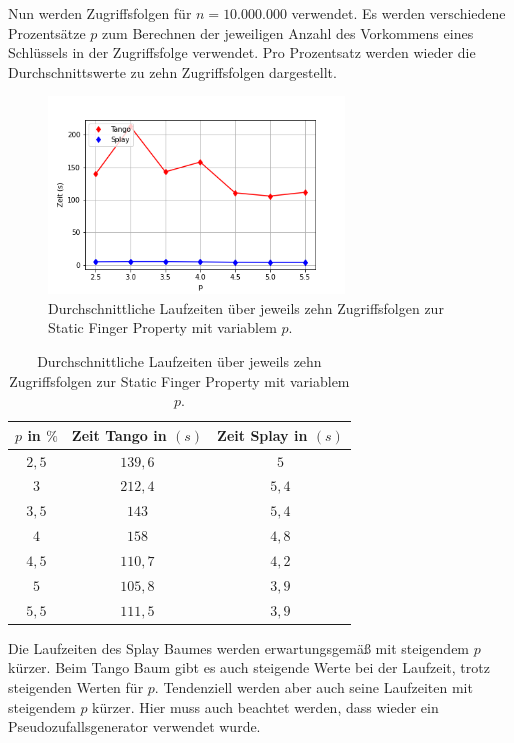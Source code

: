 \documentclass[a4paper,12pt]{article}
\begin{document}
\noindent Nun werden Zugriffsfolgen für $n = 10.000.000$ verwendet. Es werden verschiedene Prozentsätze $p$ zum Berechnen der jeweiligen Anzahl des Vorkommens eines Schlüssels in der Zugriffsfolge verwendet. Pro Prozentsatz werden wieder die Durchschnittswerte zu zehn Zugriffsfolgen dargestellt. 
\begin{figure}[H]
	\centering
	\includegraphics[width=0.7\textwidth]{Medien/laufzeittest/diagramm/staticfinger4}
	\caption{Durchschnittliche Laufzeiten über jeweils zehn Zugriffsfolgen zur Static Finger Property mit variablem $p$.}
\end{figure}
\begin{table}[H]
	\begin{center}
		\begin{tabular}[c]{|c|c|c|}
			\hline
			$p$ in $\%$ & Zeit Tango in $\left(s\right)$ &Zeit Splay in $\left(s\right)$ \\
			\hline
			$2,5$  & $139,6$ &$5$  \\
			\hline
			$3$  &   $212,4$ &  $5,4$  \\
			\hline
			$3,5$  & $143$ &$5,4$  \\
			\hline
			$4$ &    $158$ &$4,8$ \\
			\hline
			$4,5$  & $110,7$ &$4,2$  \\
			\hline
			$5$  &   $105,8$ &  $3,9$  \\
			\hline
			$5,5$  & $111,5$ &$3,9$  \\
			\hline
		\end{tabular}
		\caption{Durchschnittliche Laufzeiten über jeweils zehn Zugriffsfolgen zur Static Finger Property mit variablem $p$.} 
	\end{center}
\end{table}

\noindent Die Laufzeiten des Splay Baumes werden erwartungsgemäß mit steigendem $p$ kürzer. Beim Tango Baum gibt es auch steigende Werte bei der Laufzeit, trotz steigenden Werten für $p$. Tendenziell werden aber auch seine Laufzeiten mit steigendem $p$ kürzer. Hier muss auch beachtet werden, dass wieder ein Pseudozufallsgenerator verwendet wurde.
\end{document}
